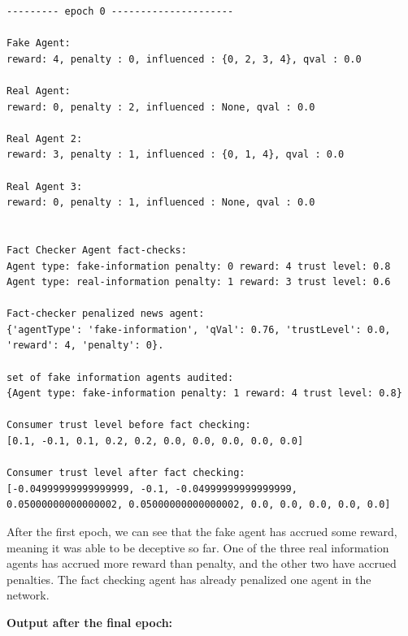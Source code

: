 \documentclass[twoside]{article}
\begin{document}
\begin{verbatim}
--------- epoch 0 ---------------------

Fake Agent: 
reward: 4, penalty : 0, influenced : {0, 2, 3, 4}, qval : 0.0

Real Agent: 
reward: 0, penalty : 2, influenced : None, qval : 0.0

Real Agent 2: 
reward: 3, penalty : 1, influenced : {0, 1, 4}, qval : 0.0

Real Agent 3: 
reward: 0, penalty : 1, influenced : None, qval : 0.0


Fact Checker Agent fact-checks: 
Agent type: fake-information penalty: 0 reward: 4 trust level: 0.8
Agent type: real-information penalty: 1 reward: 3 trust level: 0.6

Fact-checker penalized news agent: 
{'agentType': 'fake-information', 'qVal': 0.76, 'trustLevel': 0.0, 'reward': 4, 'penalty': 0}.

set of fake information agents audited:  
{Agent type: fake-information penalty: 1 reward: 4 trust level: 0.8}

Consumer trust level before fact checking:
[0.1, -0.1, 0.1, 0.2, 0.2, 0.0, 0.0, 0.0, 0.0, 0.0]

Consumer trust level after fact checking: 
[-0.04999999999999999, -0.1, -0.04999999999999999, 
0.05000000000000002, 0.05000000000000002, 0.0, 0.0, 0.0, 0.0, 0.0]

\end{verbatim}

After the first epoch, we can see that the fake agent has accrued some reward, meaning it was able to be deceptive so far. One of the three real information agents has accrued more reward than penalty, and the other two have accrued penalties. The fact checking agent has already penalized one agent in the network.


\textbf{Output after the final epoch: }
\end{document}

